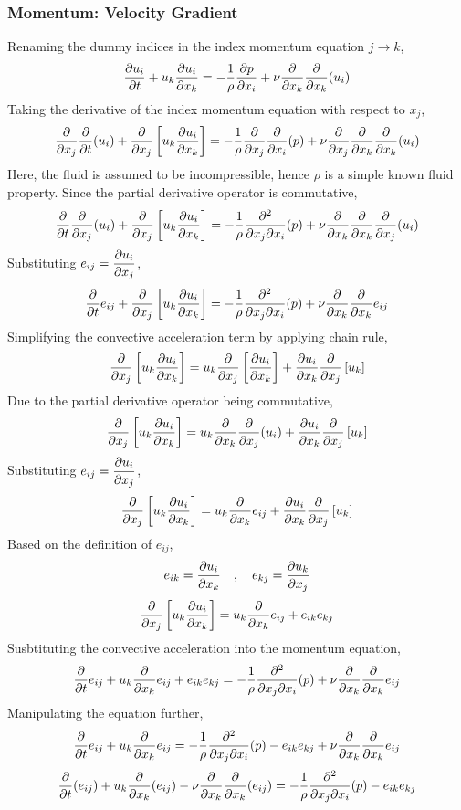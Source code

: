 \documentclass[class=report, 12pt, crop=false]{standalone}
\begin{document}
\begin{center}
\subsubsection{Momentum: Velocity Gradient}
\begin{comment}
\end{comment}
Renaming the dummy indices in the index momentum equation $j\to k$,
$$\frac{\partial u_i}{\partial t} + u_k\frac{\partial u_i}{\partial x_k} = -\frac{1}{\rho}\frac{\partial p}{\partial x_i} + \nu\frac{\partial}{\partial x_k}\frac{\partial}{\partial x_k}(u_i)$$
Taking the derivative of the index momentum equation with respect to $x_j$,
$$\frac{\partial}{\partial x_j}\frac{\partial}{\partial t}(u_i) + \frac{\partial}{\partial x_j}\left[u_k\frac{\partial u_i}{\partial x_k}\right] = -\frac{1}{\rho}\frac{\partial}{\partial x_j}\frac{\partial }{\partial x_i}(p) + \nu\frac{\partial}{\partial x_j}\frac{\partial}{\partial x_k}\frac{\partial}{\partial x_k}(u_i)$$
Here, the fluid is assumed to be incompressible, hence $\rho$ is a simple known fluid property. Since the partial derivative operator is commutative,
$$\frac{\partial}{\partial t}\frac{\partial}{\partial x_j}(u_i) + \frac{\partial}{\partial x_j}\left[u_k\frac{\partial u_i}{\partial x_k}\right] = -\frac{1}{\rho}\frac{\partial^2}{\partial x_j\partial x_i}(p) + \nu\frac{\partial}{\partial x_k}\frac{\partial}{\partial x_k}\frac{\partial}{\partial x_j}(u_i)$$
Substituting $\displaystyle{e_{ij}=\frac{\partial u_i}{\partial x_j}}$,
$$\frac{\partial}{\partial t}e_{ij} + \frac{\partial}{\partial x_j}\left[u_k\frac{\partial u_i}{\partial x_k}\right] = -\frac{1}{\rho}\frac{\partial^2}{\partial x_j\partial x_i}(p) + \nu\frac{\partial}{\partial x_k}\frac{\partial}{\partial x_k}e_{ij}$$
Simplifying the convective acceleration term by applying chain rule,
$$\frac{\partial}{\partial x_j}\left[u_k\frac{\partial u_i}{\partial x_k}\right] = u_k\frac{\partial}{\partial x_j}\left[\frac{\partial u_i}{\partial x_k}\right] + \frac{\partial u_i}{\partial x_k}\frac{\partial}{\partial x_j}\left[u_k\right]$$
Due to the partial derivative operator being commutative,
$$\frac{\partial}{\partial x_j}\left[u_k\frac{\partial u_i}{\partial x_k}\right] = u_k\frac{\partial }{\partial x_k}\frac{\partial}{\partial x_j}(u_i) + \frac{\partial u_i}{\partial x_k}\frac{\partial}{\partial x_j}\left[u_k\right]$$
Substituting $\displaystyle{e_{ij}=\frac{\partial u_i}{\partial x_j}}$,
$$\frac{\partial}{\partial x_j}\left[u_k\frac{\partial u_i}{\partial x_k}\right] = u_k\frac{\partial }{\partial x_k}e_{ij} + \frac{\partial u_i}{\partial x_k}\frac{\partial}{\partial x_j}\left[u_k\right]$$
Based on the definition of $e_{ij}$,
$$e_{ik} = \frac{\partial u_i}{\partial x_k} \quad,\quad e_{kj} = \frac{\partial u_k}{\partial x_j}$$
$$\frac{\partial}{\partial x_j}\left[u_k\frac{\partial u_i}{\partial x_k}\right] = u_k\frac{\partial }{\partial x_k}e_{ij} + e_{ik}e_{kj}$$
Susbtituting the convective acceleration into the momentum equation,
$$\frac{\partial}{\partial t}e_{ij} + u_k\frac{\partial }{\partial x_k}e_{ij} + e_{ik}e_{kj} = -\frac{1}{\rho}\frac{\partial^2}{\partial x_j\partial x_i}(p) + \nu\frac{\partial}{\partial x_k}\frac{\partial}{\partial x_k}e_{ij}$$
Manipulating the equation further,
$$\frac{\partial}{\partial t}e_{ij} + u_k\frac{\partial }{\partial x_k}e_{ij} = -\frac{1}{\rho}\frac{\partial^2}{\partial x_j\partial x_i}(p) - e_{ik}e_{kj} + \nu\frac{\partial}{\partial x_k}\frac{\partial}{\partial x_k}e_{ij}$$
$$\frac{\partial}{\partial t}(e_{ij}) + u_k\frac{\partial }{\partial x_k}(e_{ij}) - \nu\frac{\partial}{\partial x_k}\frac{\partial}{\partial x_k}(e_{ij}) = -\frac{1}{\rho}\frac{\partial^2}{\partial x_j\partial x_i}(p) - e_{ik}e_{kj}$$

\end{center}
\end{document}
